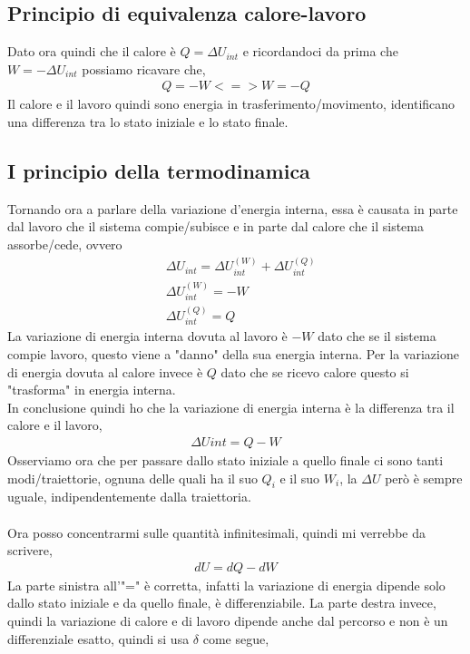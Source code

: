     \subsection{Principio di equivalenza calore-lavoro}
        Dato ora quindi che il calore è $Q = \Delta U_{int}$ e ricordandoci da prima che $W=-\Delta U_{int}$ possiamo ricavare che,
        \begin{align*}
            Q = -W <=> W = -Q
        \end{align*}
        Il calore e il lavoro quindi sono energia in trasferimento/movimento, identificano una differenza tra lo stato iniziale e lo stato finale.

    \subsection{I principio della termodinamica}
        Tornando ora a parlare della variazione d'energia interna, essa è causata in parte dal lavoro che il sistema compie/subisce e in parte dal calore che il sistema assorbe/cede, ovvero
        \begin{align*}
            &\Delta U_{int} = \Delta U_{int}^{(W)} + \Delta U_{int}^{(Q)}\\
            &\Delta U_{int}^{(W)}=-W\\
            &\Delta U_{int}^{(Q)}=Q
        \end{align*}
        La variazione di energia interna dovuta al lavoro è $-W$ dato che se il sistema compie lavoro, questo viene a "danno" della sua energia interna. Per la variazione di energia dovuta al calore invece è $Q$ dato che se ricevo calore questo si "trasforma" in energia interna.\\
        In conclusione quindi ho che la variazione di energia interna è la differenza tra il calore e il lavoro,
        \begin{align*}
            \Delta U{int} = Q - W
        \end{align*}
        Osserviamo ora che per passare dallo stato iniziale a quello finale ci sono tanti modi/traiettorie, ognuna delle quali ha il suo $Q_i$ e il suo $W_i$, la $\Delta U$ però è sempre uguale, indipendentemente dalla traiettoria.\\\\
        Ora posso concentrarmi sulle quantità infinitesimali, quindi mi verrebbe da scrivere,
        \begin{align*}
            dU = dQ - dW
        \end{align*}
        La parte sinistra all'"=" è corretta, infatti la variazione di energia dipende solo dallo stato iniziale e da quello finale, è differenziabile. La parte destra invece, quindi la variazione di calore e di lavoro dipende anche dal percorso e non è un differenziale esatto, quindi si usa $\delta$ come segue,
